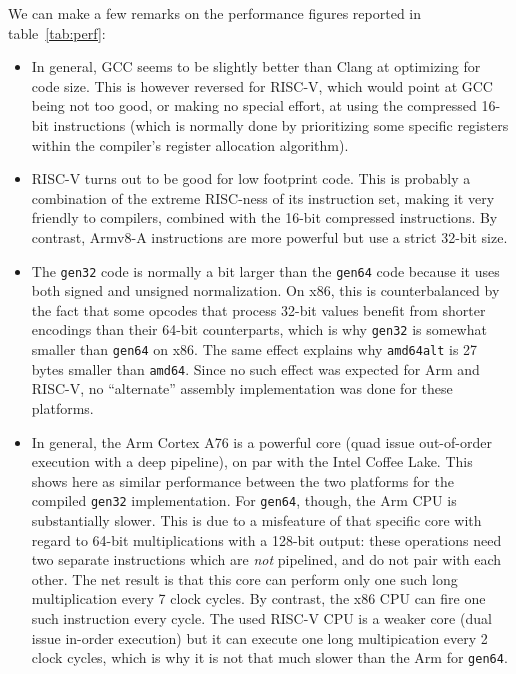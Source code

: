 \documentclass{llncs}
\begin{document}
We can make a few remarks on the performance figures reported in
table~\ref{tab:perf}:
\begin{itemize}
    \item In general, GCC seems to be slightly better than Clang at
    optimizing for code size. This is however reversed for RISC-V, which
    would point at GCC being not too good, or making no special effort,
    at using the compressed 16-bit instructions (which is normally done
    by prioritizing some specific registers within the compiler's
    register allocation algorithm).

    \item RISC-V turns out to be good for low footprint code. This is
    probably a combination of the extreme RISC-ness of its instruction
    set, making it very friendly to compilers, combined with the 16-bit
    compressed instructions. By contrast, Armv8-A instructions are
    more powerful but use a strict 32-bit size.

    \item The \verb+gen32+ code is normally a bit larger than the
    \verb+gen64+ code because it uses both signed and unsigned
    normalization. On x86, this is counterbalanced by the fact that some
    opcodes that process 32-bit values benefit from shorter encodings
    than their 64-bit counterparts, which is why \verb+gen32+ is somewhat
    smaller than \verb+gen64+ on x86. The same effect explains why
    \verb+amd64alt+ is 27 bytes smaller than \verb+amd64+. Since no such
    effect was expected for Arm and RISC-V, no ``alternate'' assembly
    implementation was done for these platforms.

    \item In general, the Arm Cortex A76 is a powerful core (quad issue
    out-of-order execution with a deep pipeline), on par with
    the Intel Coffee Lake. This shows here as similar performance between
    the two platforms for the compiled \verb+gen32+ implementation. For
    \verb+gen64+, though, the Arm CPU is substantially slower. This is
    due to a misfeature of that specific core with regard to 64-bit
    multiplications with a 128-bit output: these operations need two
    separate instructions which are \emph{not} pipelined, and do not pair
    with each other. The net result is that this core can perform only
    one such long multiplication every 7 clock cycles. By contrast, the
    x86 CPU can fire one such instruction every cycle. The used RISC-V
    CPU is a weaker core (dual issue in-order execution) but it can
    execute one long multipication every 2 clock cycles, which is why
    it is not that much slower than the Arm for \verb+gen64+.

\end{itemize}
\end{document}
